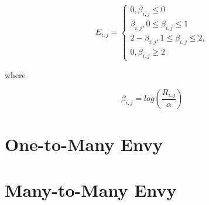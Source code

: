 \documentclass[AEJ]{AEA}
\begin{document}
\begin{equation}
    E_{i,j} = 
    \begin{cases}
        0, 
        \beta_{i,j} \le 0 \\
        \beta_{i,j}, 
        0 \le \beta_{i,j} \le 1 \\    
        2 - \beta_{i,j}, 
        1 \le \beta_{i,j} \le 2, \\
        0, 
        \beta_{i,j} \ge 2
    \end{cases}
\end{equation}

where 

\begin{equation}
    \beta_{i,j} = log(\frac{R_{i,j}}{\alpha})
\end{equation}

\section{One-to-Many Envy}
\section{Many-to-Many Envy}



\end{document}
